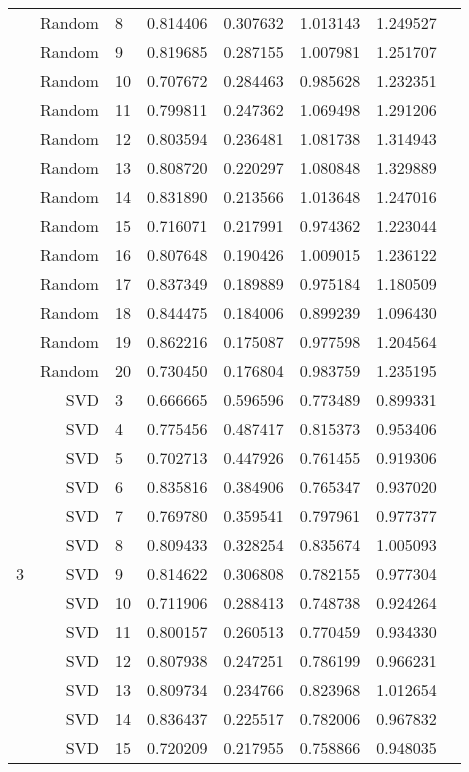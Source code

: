\documentclass[a4paper,12pt]{article}
\begin{document}
\begin{center}
\begin{longtable}{lrlrrrrr}
& Random & 8 & 0.814406 & 0.307632 & 1.013143 & 1.249527 \\
& Random & 9 & 0.819685 & 0.287155 & 1.007981 & 1.251707 \\
& Random & 10 & 0.707672 & 0.284463 & 0.985628 & 1.232351 \\
& Random & 11 & 0.799811 & 0.247362 & 1.069498 & 1.291206 \\
& Random & 12 & 0.803594 & 0.236481 & 1.081738 & 1.314943 \\
& Random & 13 & 0.808720 & 0.220297 & 1.080848 & 1.329889 \\
& Random & 14 & 0.831890 & 0.213566 & 1.013648 & 1.247016 \\
& Random & 15 & 0.716071 & 0.217991 & 0.974362 & 1.223044 \\
& Random & 16 & 0.807648 & 0.190426 & 1.009015 & 1.236122 \\
& Random & 17 & 0.837349 & 0.189889 & 0.975184 & 1.180509 \\
& Random & 18 & 0.844475 & 0.184006 & 0.899239 & 1.096430 \\
& Random & 19 & 0.862216 & 0.175087 & 0.977598 & 1.204564 \\
& Random & 20 & 0.730450 & 0.176804 & 0.983759 & 1.235195 \\ \hline
\multirow{18}{1cm}{3} & SVD & 3 & 0.666665 & 0.596596 & 0.773489 & 0.899331 \\
& SVD & 4 & 0.775456 & 0.487417 & 0.815373 & 0.953406 \\
& SVD & 5 & 0.702713 & 0.447926 & 0.761455 & 0.919306 \\
& SVD & 6 & 0.835816 & 0.384906 & 0.765347 & 0.937020 \\
& SVD & 7 & 0.769780 & 0.359541 & 0.797961 & 0.977377 \\
& SVD & 8 & 0.809433 & 0.328254 & 0.835674 & 1.005093 \\
& SVD & 9 & 0.814622 & 0.306808 & 0.782155 & 0.977304 \\
& SVD & 10 & 0.711906 & 0.288413 & 0.748738 & 0.924264 \\
& SVD & 11 & 0.800157 & 0.260513 & 0.770459 & 0.934330 \\
& SVD & 12 & 0.807938 & 0.247251 & 0.786199 & 0.966231 \\
& SVD & 13 & 0.809734 & 0.234766 & 0.823968 & 1.012654 \\
& SVD & 14 & 0.836437 & 0.225517 & 0.782006 & 0.967832 \\
& SVD & 15 & 0.720209 & 0.217955 & 0.758866 & 0.948035 \\

\end{longtable}
\end{center}
\end{document}
